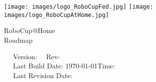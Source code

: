 \begin{titlepage}
  \begin{center}
    {
      \texttt{[image: images/logo\_RoboCupFed.jpg]}
      \hfill
      \texttt{[image: images/logo\_RoboCupAtHome.jpg]}\\[1.23ex]
    }
    \vspace{2.7 cm}
    \hrulefill\par
    {%
      \vspace*{.27cm}
      \Huge{RoboCup@Home}\\[1.23ex]
      \Large Roadmap \\[2ex]
    }
    \hrulefill\par
    \vfill
    ~~ Version: \YEAR ~~Rev-\svnRevision ~~ \\
    ~~ Last Build Date: \today \quad Time: \the\time ~~ \\
    ~~ Last Revision Date: \svnChangeData ~~ %
  \end{center}
\end{titlepage}
